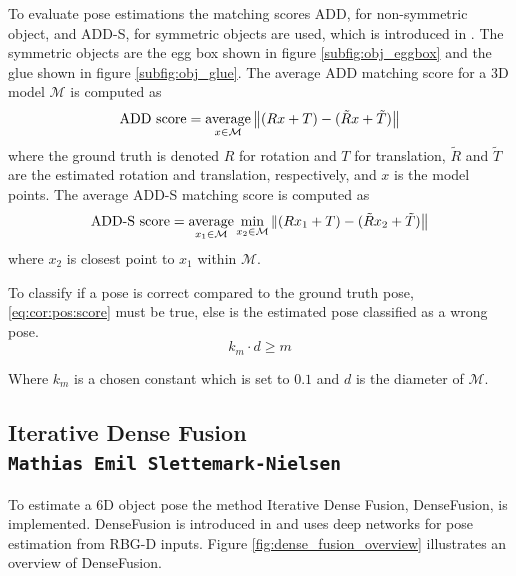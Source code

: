 \documentclass[../main.tex]{subfiles}
\begin{document}
To evaluate pose estimations the matching scores ADD, for non-symmetric object, and ADD-S, for symmetric objects are used, which is introduced in \cite{linemod_matching_score}. The symmetric objects are the egg box shown in figure \ref{subfig:obj_eggbox} and the glue shown in figure \ref{subfig:obj_glue}. The average ADD matching score for a 3D model $\mathcal{M}$ is computed as
\begin{equation}
    \text{ADD score} = \operatorname*{average}_{x \in \mathcal{M}} \big \| (R x + T) - (\tilde{R} x + \tilde{T}) \big \|
    \label{eqn:linemod_add}
\end{equation}
where the ground truth is denoted $R$ for rotation and $T$ for translation, $\tilde{R}$ and $\tilde{T}$ are the estimated rotation and translation, respectively, and $x$ is the model points. The average ADD-S matching score is computed as
\begin{equation}
\text{ADD-S score} = \operatorname*{average}_{x_1 \in \mathcal{M}} \min_{x_2 \in \mathcal{M}} \| (R x_1 + T) - (\tilde{R} x_2 + \tilde{T}) \big \|
\label{eqn:linemod_add_s}
\end{equation}
where $x_2$ is closest point to $x_1$ within $\mathcal{M}$. 

To classify if a pose is correct compared to the ground truth pose, \autoref{eq:cor:pos:score} must be true, else is the estimated pose classified as a wrong pose.
\begin{equation}
    k_{m}\cdot d \geq m
    \label{eq:cor:pos:score}
\end{equation}

Where $k_{m}$ is a chosen constant which is set to $0.1$ and $d$ is the diameter of $\mathcal{M}$.

\subsection{Iterative Dense Fusion \\ \normalfont\normalsize\texttt{Mathias Emil Slettemark-Nielsen}} \label{subsec:dense_fusion}
To estimate a 6D object pose the method Iterative Dense Fusion, DenseFusion, is implemented. DenseFusion is introduced in \cite{densefusion} and uses deep networks for pose estimation from RBG-D inputs. Figure \ref{fig:dense_fusion_overview} illustrates an overview of DenseFusion.
\end{document}
